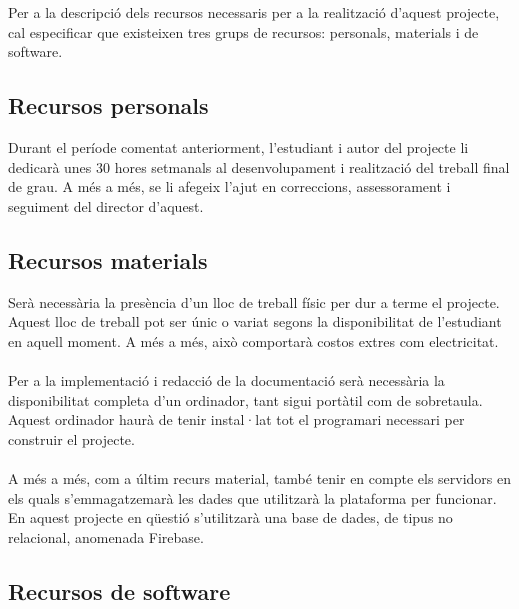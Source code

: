 Per a la descripció dels recursos necessaris per a la realització d’aquest projecte, cal especificar que existeixen tres grups de recursos: personals, materials i de software.

\subsection{Recursos personals}

Durant el període comentat anteriorment, l’estudiant i autor del projecte li dedicarà unes 30 hores setmanals al desenvolupament i realització del treball final de grau. A més a més, se li afegeix l’ajut en correccions, assessorament i seguiment del director d’aquest.

\subsection{Recursos materials}

Serà necessària la presència d’un lloc de treball físic per dur a terme el projecte. Aquest lloc de treball pot ser únic o variat segons la disponibilitat de l’estudiant en aquell moment. A més a més, això comportarà costos extres com electricitat.
\\\\
Per a la implementació i redacció de la documentació serà necessària la disponibilitat completa d’un ordinador, tant sigui portàtil com de sobretaula. Aquest ordinador haurà de tenir instal·lat tot el programari necessari per construir el projecte.
\\\\
A més a més, com a últim recurs material, també tenir en compte els servidors en els quals s’emmagatzemarà les dades que utilitzarà la plataforma per funcionar. En aquest projecte en qüestió s’utilitzarà una base de dades, de tipus no relacional, anomenada Firebase\cite{firebase}.

\subsection{Recursos de software}

